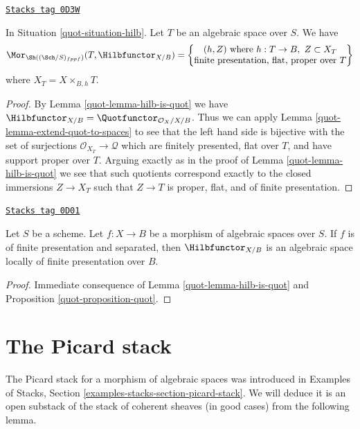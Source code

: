 \begin{lemma}
\label{quot-lemma-extend-hilb-to-spaces}
\href{https://stacks.math.columbia.edu/tag/0D3W}{\texttt{Stacks tag 0D3W}}

In Situation \ref{quot-situation-hilb}. Let $T$ be an algebraic space over $S$.
We have
$$
\Mor_{\Sh((\Sch/S)_{fppf})}(T, \Hilbfunctor_{X/B}) =
\left\{
\begin{matrix}
(h, Z)\text{ where }h : T \to B,\ Z \subset X_T \\
\text{finite presentation, flat, proper over }T
\end{matrix}
\right\}
$$
where $X_T = X \times_{B, h} T$.
\end{lemma}

\begin{proof}

By Lemma \ref{quot-lemma-hilb-is-quot}
we have $\Hilbfunctor_{X/B} = \Quotfunctor_{\mathcal{O}_X/X/B}$.
Thus we can apply Lemma \ref{quot-lemma-extend-quot-to-spaces}
to see that the left hand side is bijective with the set
of surjections $\mathcal{O}_{X_T} \to \mathcal{Q}$
which are finitely presented, flat over $T$, and
have support proper over $T$. Arguing exactly as in the
proof of Lemma \ref{quot-lemma-hilb-is-quot}
we see that such quotients correspond
exactly to the closed immersions $Z \to X_T$ such that
$Z \to T$ is proper, flat, and of finite presentation.
\end{proof}

\begin{proposition}[Hilb]
\label{quot-proposition-hilb}
\href{https://stacks.math.columbia.edu/tag/0D01}{\texttt{Stacks tag 0D01}}

Let $S$ be a scheme. Let $f : X \to B$ be a morphism of algebraic
spaces over $S$. If $f$ is of finite presentation and separated, then
$\Hilbfunctor_{X/B}$ is an algebraic space locally of finite
presentation over $B$.
\end{proposition}

\begin{proof}

Immediate consequence of
Lemma \ref{quot-lemma-hilb-is-quot}
and Proposition \ref{quot-proposition-quot}.
\end{proof}

\section{The Picard stack}
\label{quot-section-picard-stack}
The Picard stack for a morphism of algebraic spaces was introduced
in Examples of Stacks, Section \ref{examples-stacks-section-picard-stack}.
We will deduce it is an open substack of the stack of coherent sheaves
(in good cases) from the following lemma.

